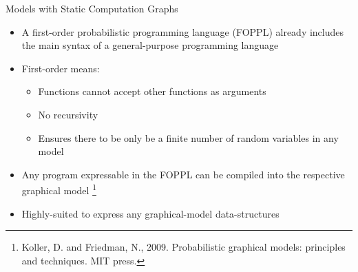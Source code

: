 \documentclass[AERbeamer%
              ,optEnglish%
              ,optBiber%
              ,optBibstyleAlphabetic%
              ,optBeamerClassicFormat%
              ]{AERlatex}%
\begin{document}
\begin{frame}[c]{Models with Static Computation Graphs}
    \centering
    \begin{itemize}
        \item A first-order probabilistic programming language (FOPPL) already includes the main syntax of a
              general-purpose programming language
        \item First-order means:
        \begin{itemize}
            \item Functions cannot accept other functions as arguments
            \item No recursivity
            \item Ensures there to be only be a finite number of random variables in any model
        \end{itemize}
        \item Any program expressable in the FOPPL can be compiled into the respective graphical model \footnote{Koller, D. and Friedman, N., 2009. Probabilistic graphical models: principles and techniques. MIT press.}
        \item Highly-suited to express any graphical-model data-structures
    \end{itemize}
\end{frame}
\end{document}
